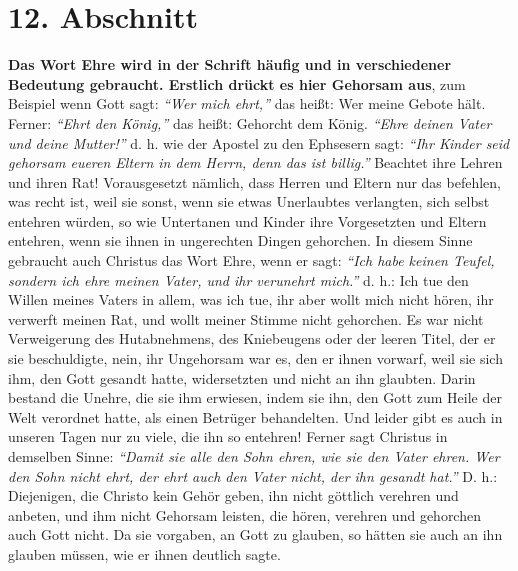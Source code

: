 \section{12. Abschnitt} \label{kap9_ab12}

\label{ref:09_12_ehre} \textbf{Das Wort Ehre
wird in der Schrift
häufig und in verschiedener Bedeutung
gebraucht. Erstlich drückt es hier Gehorsam aus}, zum Beispiel wenn
Gott sagt:
\textit{"`Wer mich ehrt,"'}
das heißt: Wer meine Gebote hält. Ferner:
\textit{"`Ehrt den König,"'}
das heißt: Gehorcht dem König.
\textit{"`Ehre deinen Vater und deine Mutter!"'}
d. h. wie der
Apostel zu den Ephsesern sagt:
\textit{"`Ihr Kinder seid gehorsam eueren Eltern in dem
Herrn, denn das ist billig."'}
Beachtet ihre Lehren und
ihren Rat! Vorausgesetzt nämlich, dass Herren und Eltern nur das befehlen, was
recht ist, weil sie sonst, wenn sie etwas Unerlaubtes verlangten, sich selbst
entehren würden, so wie Untertanen und Kinder ihre Vorgesetzten und Eltern
entehren, wenn sie ihnen in ungerechten Dingen gehorchen. In diesem Sinne
gebraucht auch Christus das Wort Ehre, wenn er sagt:
\textit{"`Ich habe keinen Teufel,
sondern ich ehre meinen Vater, und ihr verunehrt mich."'}
d. h.: Ich tue den Willen meines Vaters in allem, was ich tue, ihr aber wollt
mich nicht hören, ihr verwerft meinen Rat, und wollt meiner Stimme nicht
gehorchen. Es war nicht Verweigerung des Hutabnehmens, des Kniebeugens oder der
leeren Titel, der er sie beschuldigte, nein, ihr Ungehorsam war es, den er ihnen
vorwarf, weil sie sich ihm, den Gott gesandt hatte, widersetzten und nicht an
ihn glaubten. Darin bestand die Unehre, die sie ihm erwiesen, indem sie ihn,
den Gott zum Heile der Welt verordnet hatte, als einen Betrüger behandelten. Und
leider gibt es auch in unseren Tagen nur zu viele, die ihn so entehren! Ferner
sagt Christus in demselben Sinne:
\textit{"`Damit sie alle den Sohn ehren, wie sie den
Vater ehren. Wer den Sohn nicht ehrt, der ehrt auch den Vater nicht, der ihn
gesandt hat."'}
D. h.: Diejenigen, die Christo kein Gehör
geben, ihn nicht göttlich verehren und anbeten, und ihm nicht Gehorsam leisten,
die hören, verehren und gehorchen auch Gott nicht. Da sie vorgaben, an Gott zu
glauben, so hätten sie auch an ihn glauben müssen, wie er ihnen deutlich sagte.
